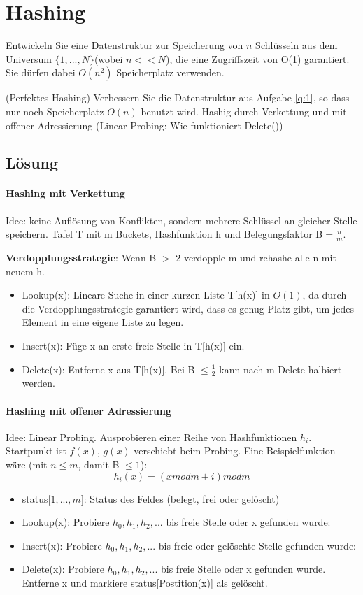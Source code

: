 \section{Hashing}
	Entwickeln Sie eine Datenstruktur zur Speicherung von $n$ Schlüsseln aus dem Universum $\{1,...,N\}$(wobei $n<<N$), die eine Zugriffszeit von O(1) garantiert. Sie dürfen dabei $O(n^2)$ Speicherplatz verwenden.
	
(Perfektes Hashing) Verbessern Sie die Datenstruktur aus Aufgabe \ref{q:1}, so dass nur noch Speicherplatz $O(n)$ benutzt wird.
Hashig durch Verkettung und mit offener Adressierung (Linear Probing: Wie funktioniert Delete())

\subsection*{Lösung}
\paragraph{Hashing mit Verkettung} Idee: keine Auflösung von Konflikten, sondern mehrere Schlüssel an gleicher Stelle speichern. Tafel T mit m Buckets, Hashfunktion h und Belegungsfaktor B$ =\frac{n}{m} $.

\textbf{Verdopplungsstrategie}: Wenn B $ > $ 2 verdopple m und rehashe alle n mit neuem h.
\begin{itemize}
    \item[] Lookup(x): Lineare Suche in einer kurzen Liste T[h(x)] in $O(1)$, da durch die Verdopplungsstrategie garantiert wird, dass es genug Platz gibt, um jedes Element in eine eigene Liste zu legen.
    \item[] Insert(x): Füge x an erste freie Stelle in T[h(x)] ein.
    \item[] Delete(x): Entferne x aus T[h(x)]. Bei B $\leq \frac{1}{2}$ kann nach m Delete halbiert werden.
\end{itemize}

\paragraph{Hashing mit offener Adressierung} Idee: Linear Probing. Ausprobieren einer Reihe von Hashfunktionen $ h_i $. Startpunkt ist $ f(x) $, $ g(x) $ verschiebt beim Probing. Eine Beispielfunktion wäre (mit $n\leq m$, damit B $ \leq 1 $):
\[ h_i(x) = (x modm + i)modm \]

\begin{itemize}
    \item[] status[$1,...,m$]: Status des Feldes (belegt, frei oder gelöscht)
    \item[] Lookup(x): Probiere $ h_0, h_1, h_2,... $ bis freie Stelle oder x gefunden wurde:
    \item[] Insert(x): Probiere $ h_0, h_1, h_2,... $ bis freie oder gelöschte Stelle gefunden wurde:
    \item[] Delete(x): Probiere $ h_0, h_1, h_2,... $ bis freie Stelle oder x gefunden wurde. Entferne x und markiere status[Postition(x)] als gelöscht.
\end{itemize}


